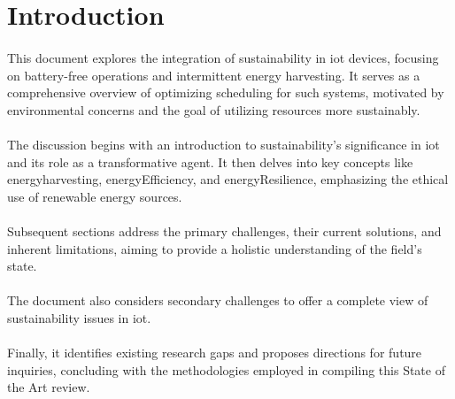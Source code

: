 \section{Introduction}

    \paragraph{}
    This document explores the integration of sustainability in \gls{iot} devices, focusing on battery-free operations and intermittent energy harvesting. It serves as a comprehensive overview of optimizing scheduling for such systems, motivated by environmental concerns and the goal of utilizing resources more sustainably.
    
    \paragraph{}
    The discussion begins with an introduction to sustainability's significance in \gls{iot} and its role as a transformative agent. It then delves into key concepts like \gls{energyharvesting}, \gls{energyEfficiency}, and \gls{energyResilience}, emphasizing the ethical use of renewable energy sources.
    
    \paragraph{}
    Subsequent sections address the primary challenges, their current solutions, and inherent limitations, aiming to provide a holistic understanding of the field's state.
    
    \paragraph{}
    The document also considers secondary challenges to offer a complete view of sustainability issues in \gls{iot}.
    
    \paragraph{}
    Finally, it identifies existing research gaps and proposes directions for future inquiries, concluding with the methodologies employed in compiling this State of the Art review.